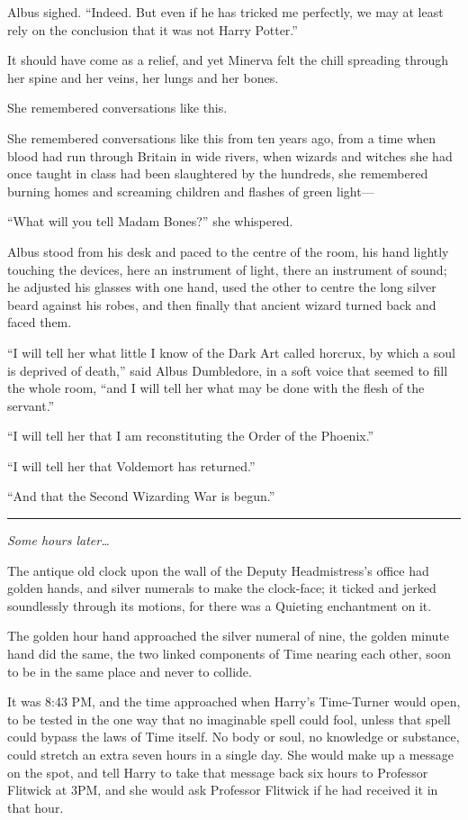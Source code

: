 Albus sighed. ``Indeed. But even if he has tricked me perfectly, we may
at least rely on the conclusion that it was not Harry Potter.''

It should have come as a relief, and yet Minerva felt the chill
spreading through her spine and her veins, her lungs and her bones.

She remembered conversations like this.

She remembered conversations like this from ten years ago, from a time
when blood had run through Britain in wide rivers, when wizards and
witches she had once taught in class had been slaughtered by the
hundreds, she remembered burning homes and screaming children and
flashes of green light---

``What will you tell Madam Bones?'' she whispered.

Albus stood from his desk and paced to the centre of the room, his hand
lightly touching the devices, here an instrument of light, there an
instrument of sound; he adjusted his glasses with one hand, used the
other to centre the long silver beard against his robes, and then
finally that ancient wizard turned back and faced them.

``I will tell her what little I know of the Dark Art called horcrux, by
which a soul is deprived of death,'' said Albus Dumbledore, in a soft
voice that seemed to fill the whole room, ``and I will tell her what may
be done with the flesh of the servant.''

``I will tell her that I am reconstituting the Order of the Phoenix.''

``I will tell her that Voldemort has returned.''

``And that the Second Wizarding War is begun.''

\begin{center}\rule{3in}{0.4pt}\end{center}

\emph{Some hours later\ldots{}}

The antique old clock upon the wall of the Deputy Headmistress's office
had golden hands, and silver numerals to make the clock-face; it ticked
and jerked soundlessly through its motions, for there was a Quieting
enchantment on it.

The golden hour hand approached the silver numeral of nine, the golden
minute hand did the same, the two linked components of Time nearing each
other, soon to be in the same place and never to collide.

It was 8:43 PM, and the time approached when Harry's Time-Turner would
open, to be tested in the one way that no imaginable spell could fool,
unless that spell could bypass the laws of Time itself. No body or soul,
no knowledge or substance, could stretch an extra seven hours in a
single day. She would make up a message on the spot, and tell Harry to
take that message back six hours to Professor Flitwick at 3PM, and she
would ask Professor Flitwick if he had received it in that hour.

